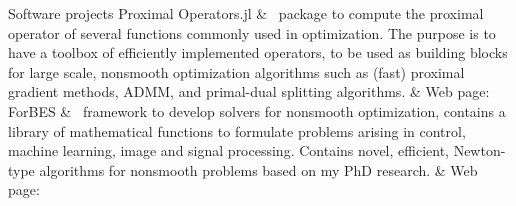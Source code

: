 \begin{cvsection}{Software projects
}
Proximal Operators.jl		& \ package to compute the proximal operator of several functions commonly used in optimization. The purpose is to have a toolbox of efficiently implemented operators, to be used as building blocks for large scale, nonsmooth optimization algorithms such as (fast) proximal gradient methods, ADMM, and primal-dual splitting algorithms. \spacednewline
			& Web page: \href{https://github.com/kul-forbes/ProximalOperators.jl}{}\spacednewline
ForBES		& \ framework to develop solvers for nonsmooth optimization, contains a library of mathematical functions to formulate problems arising in control, machine learning, image and signal processing.
Contains novel, efficient, Newton-type algorithms for nonsmooth problems based on my PhD research. \spacednewline
			& Web page: \href{https://kul-forbes.github.io/ForBES}{} \spacednewline
\end{cvsection}
